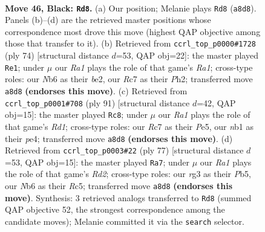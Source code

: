\documentclass[11pt]{article}
\begin{document}
\clearpage

\begin{figure}[p]\centering
\begin{subfigure}{0.46\textwidth}\centering
\resizebox{\linewidth}{!}{%
\newchessgame
\chessboard[
  setfen={r5k1/2r2p1p/1n4p1/p3p1P1/P3P3/1P4RP/4K1P1/RN6 b - - 7 46},
  showmover=false,
  pgfstyle=straightmove, color=movearrow, markmove={a8-d8}
]}
\caption{}
\end{subfigure}\hfill
\begin{subfigure}{0.46\textwidth}\centering
\resizebox{\linewidth}{!}{%
\newchessgame
\chessboard[
  setfen={k2r4/1p6/p4r1p/2R1N1p1/PP1p2P1/8/3Pb2P/R5K1 w - - 1 38},
  showmover=false,
  pgfstyle=straightmove, color=movearrow, markmove={a1-e1}
]}
\caption{}
\end{subfigure}
\\[4pt]
\begin{subfigure}{0.46\textwidth}\centering
\resizebox{\linewidth}{!}{%
\newchessgame
\chessboard[
  setfen={3r2k1/1p3rp1/p2p4/P2Pp2p/4P2P/1R4P1/1P4K1/3R4 b - - 0 46},
  showmover=false,
  pgfstyle=straightmove, color=movearrow, markmove={d8-c8}
]}
\caption{}
\end{subfigure}\hfill
\begin{subfigure}{0.46\textwidth}\centering
\resizebox{\linewidth}{!}{%
\newchessgame
\chessboard[
  setfen={8/3r1kp1/3p3p/1prP1p1P/5P2/1P1R2P1/5PK1/4R3 b - - 6 39},
  showmover=false,
  pgfstyle=straightmove, color=movearrow, markmove={d7-a7}
]}
\caption{}
\end{subfigure}
\caption{\textbf{Move 46, Black: \texttt{Rd8}.} (a) Our position; Melanie plays \texttt{Rd8} (\texttt{a8d8}). Panels (b)--(d) are the retrieved master positions whose correspondence most drove this move (highest QAP objective among those that transfer to it). (b) Retrieved from \texttt{ccrl\_top\_p0000\#1728} (ply 74) [structural distance $d$=53, QAP obj=22]: the master played \texttt{Re1}; under $\mu$ our \emph{Ra1} plays the role of that game's \emph{Ra1}; cross-type roles: our \emph{N}b6 as their \emph{b}e2, our \emph{R}c7 as their \emph{P}h2; transferred move \texttt{a8d8} \textbf{(endorses this move)}. (c) Retrieved from \texttt{ccrl\_top\_p0001\#708} (ply 91) [structural distance $d$=42, QAP obj=15]: the master played \texttt{Rc8}; under $\mu$ our \emph{Ra1} plays the role of that game's \emph{Rd1}; cross-type roles: our \emph{R}c7 as their \emph{P}e5, our \emph{n}b1 as their \emph{p}e4; transferred move \texttt{a8d8} \textbf{(endorses this move)}. (d) Retrieved from \texttt{ccrl\_top\_p0003\#22} (ply 77) [structural distance $d$=53, QAP obj=15]: the master played \texttt{Ra7}; under $\mu$ our \emph{Ra1} plays the role of that game's \emph{Rd2}; cross-type roles: our \emph{r}g3 as their \emph{P}b5, our \emph{N}b6 as their \emph{R}c5; transferred move \texttt{a8d8} \textbf{(endorses this move)}. Synthesis: 3 retrieved analogs transferred to \texttt{Rd8} (summed QAP objective 52, the strongest correspondence among the candidate moves); Melanie committed it via the \texttt{search} selector.}
\label{fig:thought-m91}
\end{figure}
\end{document}
